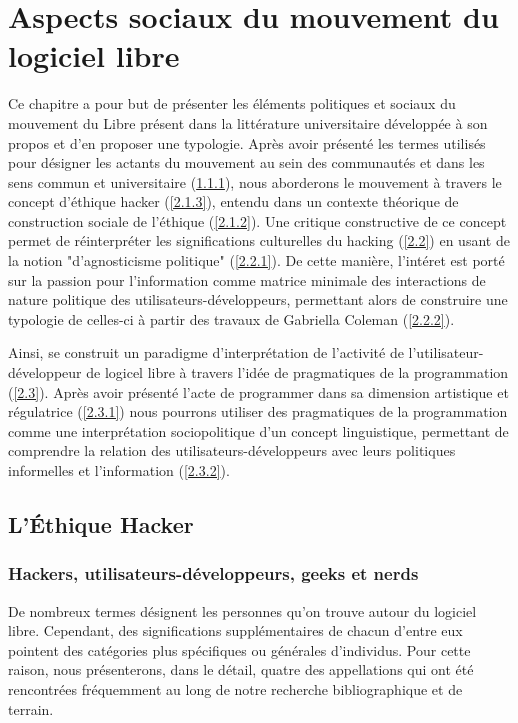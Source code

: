 \chapter{Aspects sociaux du mouvement du logiciel libre} \label{2}

Ce chapitre a pour but de présenter les éléments politiques et sociaux du mouvement du Libre présent dans la littérature universitaire développée à son propos et d'en proposer une typologie. Après avoir présenté les termes utilisés pour désigner les actants du mouvement au sein des communautés et dans les sens commun et universitaire (\ref{2.1.1}), nous aborderons le mouvement à travers le concept d'éthique hacker (\ref{2.1.3}), entendu dans un contexte théorique de construction sociale de l'éthique (\ref{2.1.2}). Une critique constructive de ce concept permet de réinterpréter les significations culturelles du hacking (\ref{2.2}) en usant de la notion "d'agnosticisme politique" (\ref{2.2.1}). De cette manière, l'intéret est porté sur la passion pour l'information comme matrice minimale des interactions de nature politique des utilisateurs-développeurs, permettant alors de construire une typologie de celles-ci à partir des travaux de Gabriella Coleman (\ref{2.2.2}).

Ainsi, se construit un paradigme d'interprétation de l'activité de l'utilisateur-développeur de logicel libre à travers l'idée de pragmatiques de la programmation (\ref{2.3}). Après avoir présenté l'acte de programmer dans sa dimension artistique et régulatrice (\ref{2.3.1}) nous pourrons utiliser des pragmatiques de la programmation comme une interprétation sociopolitique d'un concept linguistique, permettant de comprendre la relation des utilisateurs-développeurs avec leurs politiques informelles et l'information (\ref{2.3.2}).

\section{L'\'Ethique Hacker} \label{2.1}

\subsection{Hackers, utilisateurs-développeurs, geeks et nerds} \label{2.1.1}

De nombreux termes désignent les personnes qu'on trouve autour du logiciel libre. Cependant, des significations supplémentaires de chacun d'entre eux pointent des catégories plus spécifiques ou générales d'individus. Pour cette raison, nous présenterons, dans le détail, quatre des appellations qui ont été rencontrées fréquemment au long de notre recherche bibliographique et de terrain.

